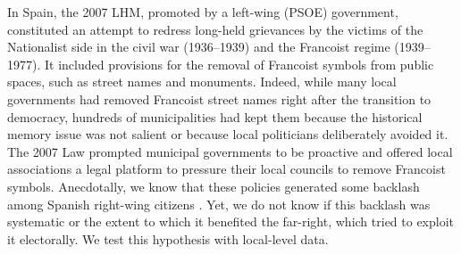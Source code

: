 \documentclass[12pt, titlepage]{article}
\begin{document}
In Spain, the 2007 LHM, promoted by a left-wing (PSOE) government, constituted an attempt to redress long-held grievances by the victims of the Nationalist side in the civil war (1936--1939) and the Francoist regime (1939--1977). It included provisions for the removal of Francoist symbols from public spaces, such as street names and monuments. Indeed, while many local governments had removed Francoist street names right after the transition to democracy, hundreds of municipalities had kept them because the historical memory issue was not salient or because local politicians deliberately avoided it.
The 2007 Law prompted municipal governments to be proactive and offered local associations a legal platform to pressure their local councils to remove Francoist symbols. Anecdotally, we know that these policies generated some backlash among Spanish right-wing citizens \citep[e.g.][]{Ezquiaga2021}. Yet, we do not know if this backlash was systematic or the extent to which it benefited the far-right, which tried to exploit it electorally. We test this hypothesis with local-level data.




\end{document}
